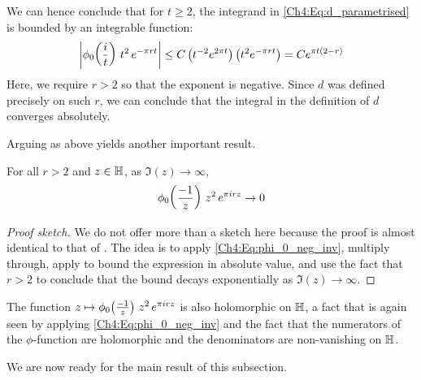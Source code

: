 We can hence conclude that for $t \geq 2$, the integrand in \eqref{Ch4:Eq:d_parametrised} is bounded by an integrable function:
\begin{align*}
    \left\lvert \phi_0\!\left( \frac{i}{t} \right) \, t^2 \, e^{-\pi r t} \right\rvert 
    \leq C \left( t^{-2} e^{2\pi t} \right) \left( t^2 e^{-\pi r t} \right)
    = C e^{\pi t \left( 2 - r \right)}
\end{align*}
Here, we require $r > 2$ so that the exponent is negative. Since $d$ was defined precisely on such $r$, we can conclude that the integral in the definition of $d$ converges absolutely.

Arguing as above yields another important result.
\begin{boxlemma}\label{Ch4:Lemma:d_integrand_vanish_tendsto_ImInfty}
    For all $r > 2$ and $z \in \mathbb{H}$, as $\Im(z) \to \infty$,
    \begin{align*}
        \phi_{0}\!\left( \frac{-1}{z} \right) \, z^2 \, e^{\pi i r z} \to 0
    \end{align*}
\end{boxlemma}
\begin{proof}[Proof sketch]
    We do not offer more than a sketch here because the proof is almost identical to that of . The idea is to apply \eqref{Ch4:Eq:phi_0_neg_inv}, multiply through, apply  to bound the expression in absolute value, and use the fact that $r > 2$ to conclude that the bound decays exponentially as $\Im(z) \to \infty$.
\end{proof}

The function $z \mapsto \phi_{0}\!\left( \frac{-1}{z} \right) \, z^2 \, e^{\pi i r z}$ is also holomorphic on $\mathbb{H}$, a fact that is again seen by applying \eqref{Ch4:Eq:phi_0_neg_inv} and the fact that the numerators of the $\phi$-function are holomorphic and the denominators are non-vanishing on $\mathbb{H}$.

We are now ready for the main result of this subsection.

